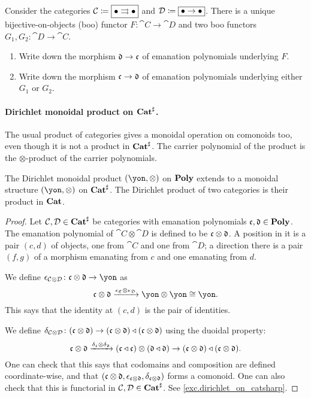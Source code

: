 \documentclass[DynamicalBook]{subfiles}
\begin{document}
\begin{exercise}
Consider the categories $\mathcal{C}\coloneqq\fbox{$\bullet\rightrightarrows\bullet$}$ and $\mathcal{D}\coloneqq\fbox{$\bullet\to\bullet$}$. There is a unique bijective-on-objects (boo) functor $F\colon\cat{C}\to\cat{D}$ and two boo functors $G_1,G_2\colon\cat{D}\to\cat{C}$.
\begin{enumerate}
	\item Write down the morphism $\mathfrak{d}\to\mathfrak{c}$ of emanation polynomials underlying $F$.
	\item Write down the morphism $\mathfrak{c}\to\mathfrak{d}$ of emanation polynomials underlying either $G_1$ or $G_2$.
\qedhere
\end{enumerate}
\end{exercise}

\paragraph{Dirichlet monoidal product on $\textbf{Cat}^\sharp$.}

The usual product of categories gives a monoidal operation on comonoids too, even though it is not a product in $\textbf{Cat}^\sharp$. The carrier polynomial of the product is the $\otimes$-product of the carrier polynomials.


\begin{proposition}\label{prop.dirichlet_on_catsharp}
The Dirichlet monoidal product $(\yon,\otimes)$ on $\textbf{Poly}$ extends to a monoidal structure $(\yon,\otimes)$ on $\textbf{Cat}^\sharp$. The Dirichlet product of two categories is their product in $\textbf{Cat}$.
\end{proposition}
\begin{proof}
Let $\mathcal{C},\mathcal{D}\in\textbf{Cat}^\sharp$ be categories with emanation polynomials $\mathfrak{c},\mathfrak{d}\in\textbf{Poly}$. The emanation polynomial of $\cat{C}\otimes\cat{D}$ is defined to be $\mathfrak{c}\otimes\mathfrak{d}$. A position in it is a pair $(c,d)$ of objects, one from $\cat{C}$ and one from $\cat{D}$; a direction there is a pair $(f,g)$ of a morphism emanating from $c$ and one emanating from $d$. 

We define $\epsilon_{\cat{C}\otimes\cat{D}}\colon\ema{c}\otimes\ema{d}\to\yon$ as
\[
\ema{c}\otimes\ema{d}\To{\epsilon_{\ema{C}}\otimes\epsilon_{\ema{D}}}\yon\otimes\yon\cong\yon.
\]
This says that the identity at $(c,d)$ is the pair of identities.

We define $\delta_{\mathcal{C}\otimes\mathcal{D}}\colon(\mathfrak{c}\otimes\mathfrak{d})\to(\mathfrak{c}\otimes\mathfrak{d})\mathbin{\triangleleft}(\mathfrak{c}\otimes\mathfrak{d})$ using the duoidal property:
\[
\mathfrak{c}\otimes\mathfrak{d}\xrightarrow{\delta_{\mathfrak{c}}\otimes\delta_{\mathfrak{d}}}(\mathfrak{c}\mathbin{\triangleleft}\mathfrak{c})\otimes(\mathfrak{d}\mathbin{\triangleleft}\mathfrak{d})\to(\mathfrak{c}\otimes\mathfrak{d})\mathbin{\triangleleft}(\mathfrak{c}\otimes\mathfrak{d}).
\]
One can check that this says that codomains and composition are defined coordinate-wise, and that $(\mathfrak{c}\otimes\mathfrak{d},\epsilon_{\mathfrak{c}\otimes\mathfrak{d}},\delta_{\mathfrak{c}\otimes\mathfrak{d}})$ forms a comonoid. One can also check that this is functorial in $\mathcal{C},\mathcal{D}\in\textbf{Cat}^\sharp$. See \cref{exc.dirichlet_on_catsharp}.
\end{proof}
\end{document}
